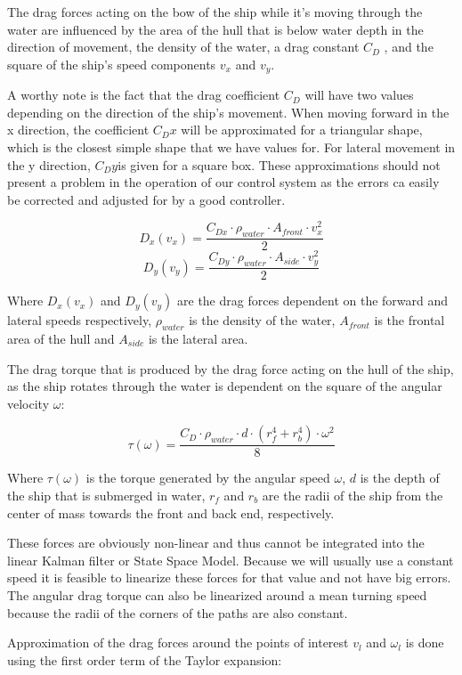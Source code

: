 The drag forces acting on the bow of the ship while it's moving through the water are influenced by the area of the hull that is below water depth in the direction of movement, the density of the water, a drag constant $ C_{D} $ , and the square of the ship's speed components $ v_{x} $ and $ v_{y} $. 

A worthy note is the fact that the drag coefficient $ C_{D} $ will have two values depending on the direction of the ship's movement. When moving forward in the x direction, the coefficient $ C_{D}x $ will be approximated for a triangular shape, which is the closest simple shape that we have values for. For lateral movement in the y direction, $ C_{D}y $is given for a square box. These approximations should not present a problem in the operation of our control system as the errors ca easily be corrected and adjusted for by a good controller.

\[ D_{x}(v_{x}) = \frac{C_{Dx}\cdot\rho_{water}\cdot A_{front}\cdot v_{x}^{2}}{2} \]
\[ D_{y}(v_{y}) = \frac{C_{Dy}\cdot\rho_{water}\cdot A_{side}\cdot  v_{y}^{2}}{2} \]

Where $ D_{x}(v_{x}) $ and $ D_{y}(v_{y})$ are the drag forces dependent on the forward and lateral speeds respectively, $ \rho_{water} $ is the density of the water, $ A_{front} $ is the frontal area of the hull and $ A_{side} $ is the lateral area. 

The drag torque that is produced by the drag force acting on the hull of the ship, as the ship rotates through the water is dependent on the square of the angular velocity $ \omega $:

\[ \tau(\omega) = \frac{C_{D} \cdot \rho_{water} \cdot d \cdot (r_{f}^{4} + r_{b}^{4}) \cdot \omega^{2}}{8} \]

Where $ \tau(\omega) $ is the torque generated by the angular speed $ \omega $, $ d  $ is the depth of the ship that is submerged in water, $ r_{f} $ and $ r_{b} $ are the radii of the ship from the center of mass towards the front and back end, respectively.

These forces are obviously non-linear and thus cannot be integrated into the linear Kalman filter or State Space Model. Because we will usually use a constant speed it is feasible to linearize these forces for that value and not have big errors. The angular drag torque can also be linearized around a mean turning speed because the radii of the corners of the paths are also constant.

Approximation of the drag forces around the points of interest $v_{l} $ and $\omega_{l}$ is done using the first order term of the Taylor expansion:

